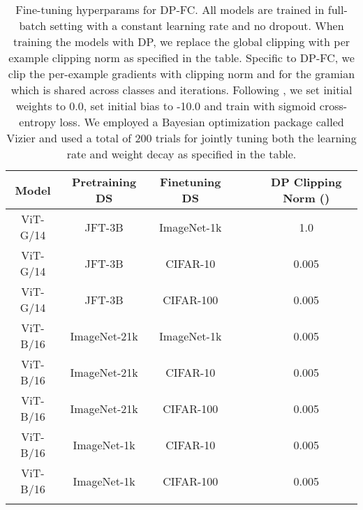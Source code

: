 \documentclass[letterpaper]{article} \usepackage{fullpage}
\begin{document}
\begin{table}[H]
    \centering
\label{tab:hparams_lamb}
    \begin{tabular}{cccccc}
    \toprule
        Model & Pretraining DS & Finetuning DS &  &  & DP Clipping Norm ()  \\
        \midrule
      ViT-G/14 & JFT-3B & ImageNet-1k &  &  & 1.0 \\
           ViT-G/14 & JFT-3B & CIFAR-10 &  &  & 0.005 \\
      ViT-G/14 & JFT-3B & CIFAR-100 &  &  & 0.005 \\
      ViT-B/16 & ImageNet-21k & ImageNet-1k &  &  & 0.005 \\
      ViT-B/16 & ImageNet-21k & CIFAR-10 &  &  & 0.005 \\
      ViT-B/16 & ImageNet-21k & CIFAR-100 &  &  & 0.005 \\
     ViT-B/16 & ImageNet-1k & CIFAR-10 &  &  & 0.005 \\
      ViT-B/16 & ImageNet-1k & CIFAR-100 &  &  & 0.005 \\
         \bottomrule
         \addlinespace[0.3cm]
    \end{tabular}
        \caption{Fine-tuning hyperparams for DP-FC. All models are trained in full-batch setting with a constant learning rate and no dropout. When training the models with DP, we replace the global clipping with per example clipping norm as specified in the table. Specific to DP-FC, we clip the per-example gradients with clipping norm  and  for the gramian which is shared across classes and iterations. Following \cite{mehta2022large}, we set initial weights to 0.0, set initial bias to -10.0 and train with sigmoid cross-entropy loss. We employed a Bayesian optimization package called Vizier \citep{vizier, oss_vizier} and used a total of 200 trials for jointly tuning both the learning rate and weight decay as specified in the table.}
\end{table}
\end{document}
